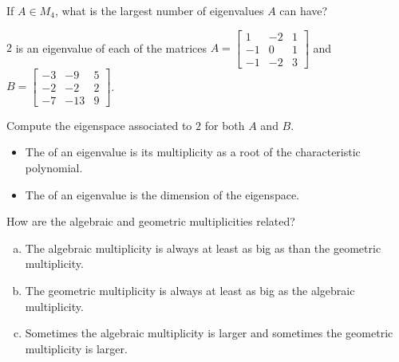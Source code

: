 
\begin{applicationActivities}{4}{29}

\begin{activity}{0}
  If $A \in M_4$, what is the largest number of eigenvalues $A$ can have?
\end{activity}

\begin{activity}{0}
  $2$ is an eigenvalue of each of the matrices $A=\begin{bmatrix} 1 & -2 & 1 \\ -1 & 0 & 1 \\ -1 & -2 & 3\end{bmatrix}$ and $B=\begin{bmatrix} -3 & -9 & 5 \\ -2 & -2 & 2 \\ -7 & -13 & 9 \end{bmatrix}$.

  Compute the eigenspace associated to $2$ for both $A$ and $B$.
\end{activity}

\begin{definition}

\begin{itemize}
\item The  of an eigenvalue is its multiplicity as a root of the characteristic polynomial.
\item The  of an eigenvalue is the dimension of the eigenspace.
\end{itemize}

\end{definition}

\begin{activity}{0} How are the algebraic and geometric multiplicities related?
\begin{enumerate}[(a)]
\item The algebraic multiplicity is always at least as big as than the geometric multiplicity.
\item The geometric multiplicity is always at least as big as the algebraic multiplicity.
\item Sometimes the algebraic multiplicity is larger and sometimes the geometric multiplicity is larger.
\end{enumerate}
\end{activity}


\end{applicationActivities}
